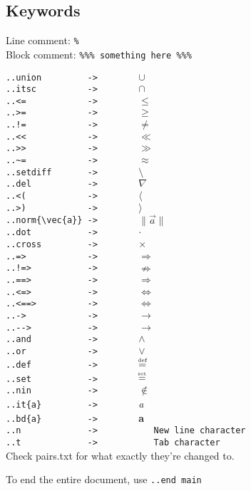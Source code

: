 \documentclass[12pt]{article}
\newcommand{\norm}[1]{\|#1\|}
\newcommand{\pytexdef}{\mathrel{\stackrel{\makebox[0pt]{\mbox{\normalfont\tiny def}}}{=}}}
\newcommand{\pytexset}{\mathrel{\stackrel{\makebox[0pt]{\mbox{\normalfont\tiny set}}}{=}}}
\begin{document}
\begin{flushleft}
\section{Keywords}

Line comment: \verb|%|\\
Block comment: \verb|%|\verb|%|\verb|%|\verb| something here |\verb|%|\verb|%|\verb|%|

\medskip

\verb|..union         ->        |$\cup$\\
\verb|..itsc          ->        |$\cap$\\
\verb|..<=            ->        |$\leq$\\
\verb|..>=            ->        |$\geq$\\
\verb|..!=            ->        |$\neq$\\
\verb|..<<            ->        |$\ll$\\
\verb|..>>            ->        |$\gg$\\
\verb|..~=            ->        |$\approx$\\
\verb|..setdiff       ->        |$\setminus$\\
\verb|..del           ->        |$\nabla$\\
\verb|..<(            ->        |$\langle$\\
\verb|..>)            ->        |$\rangle$\\
\verb|..norm{\vec{a}} ->        |$\norm{\vec{a}}$\\
\verb|..dot           ->        |$\cdot$\\
\verb|..cross         ->        |$\times$\\
\verb|..=>            ->        |$\Rightarrow$\\
\verb|..!=>           ->        |$\nRightarrow$\\
\verb|..==>           ->        |$\Longrightarrow$\\
\verb|..<=>           ->        |$\Leftrightarrow$\\
\verb|..<==>          ->        |$\iff$\\
\verb|..->            ->        |$\to$\\
\verb|..-->           ->        |$\longrightarrow$\\
\verb|..and           ->        |$\wedge$\\
\verb|..or            ->        |$\vee$\\
\verb|..def           ->        |$\pytexdef$\\
\verb|..set           ->        |$\pytexset$\\
\verb|..nin           ->        |$\notin$\\
\bigskip
\verb|..it{a}         ->        |\emph{a}\\
\verb|..bd{a}         ->        |\textbf{a}\\
\verb|..n             ->           New line character|\\
\verb|..t             ->           Tab character|\\

\bigskip
Check pairs.txt for what exactly they're changed to.

\bigskip

To end the entire document, use \verb|..end main|
\end{flushleft}
\end{document}
